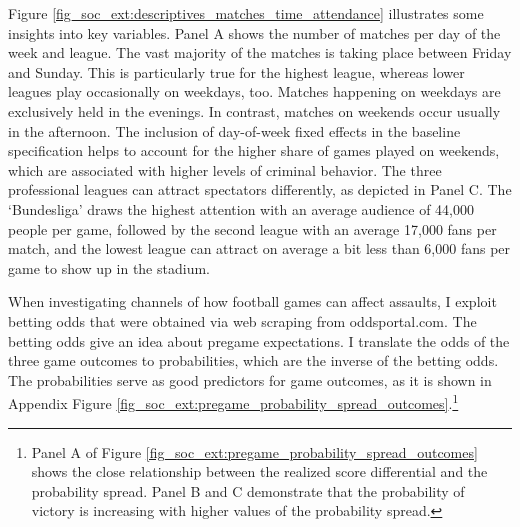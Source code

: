 


Figure \ref{fig_soc_ext:descriptives_matches_time_attendance} illustrates some insights into key variables. Panel A shows the number of matches per day of the week and league. The vast majority of the matches is taking place between Friday and Sunday. This is particularly true for the highest league, whereas lower leagues play occasionally on weekdays, too. Matches happening on weekdays are exclusively held in the evenings. In contrast, matches on weekends occur usually in the afternoon. The inclusion of day-of-week fixed effects in the baseline specification helps to account for the higher share of games played on weekends, which are associated with higher levels of criminal behavior. The three professional leagues can attract spectators differently, as depicted in Panel C. The `Bundesliga' draws the highest attention with an average audience of 44,000 people per game, followed by the second league with an average 17,000 fans per match, and the lowest league can attract on average a bit less than 6,000 fans per game to show up in the stadium.

When investigating channels of how football games can affect assaults, I exploit betting odds that were obtained via web scraping from oddsportal.com. The betting odds give an idea about pregame expectations. I translate the odds of the three game outcomes to probabilities, which are the inverse of the betting odds. The probabilities serve as good predictors for game outcomes, as it is shown in Appendix Figure \ref{fig_soc_ext:pregame_probability_spread_outcomes}.\footnote{Panel A of Figure \ref{fig_soc_ext:pregame_probability_spread_outcomes} shows the close relationship between the realized score differential and the probability spread. Panel B and C demonstrate that the probability of victory is increasing with higher values of the probability spread.}



